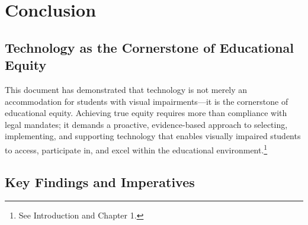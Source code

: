 \chapter{Conclusion}\label{main-conclusion}

\section{Technology as the Cornerstone of Educational Equity}

This document has demonstrated that technology is not merely an accommodation for students with visual impairments—it is the cornerstone of educational equity. Achieving true equity requires more than compliance with legal mandates; it demands a proactive, evidence-based approach to selecting, implementing, and supporting technology that enables visually impaired students to access, participate in, and excel within the educational environment.\footnote{See Introduction and Chapter 1.}

\section{Key Findings and Imperatives}

